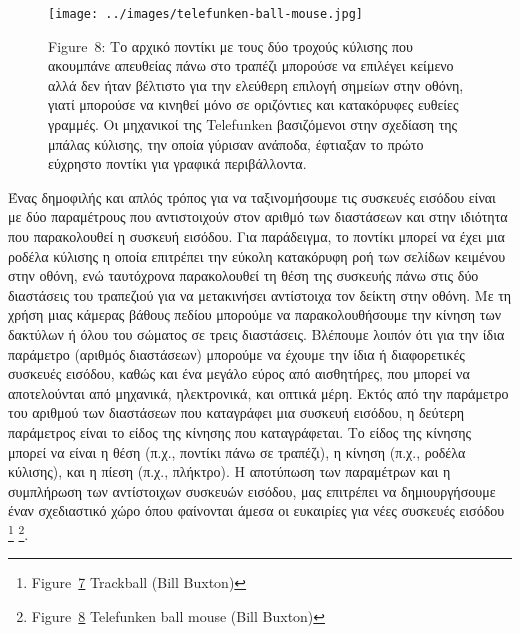 \documentclass[
]{article}
\begin{document}
\leavevmode{}%
\begin{figure}
\hypertarget{fig:telefunken-ball-mouse}{%
\centering
\texttt{[image: ../images/telefunken-ball-mouse.jpg]}
\caption{Figure~8: Το αρχικό ποντίκι με τους δύο τροχούς κύλισης που
ακουμπάνε απευθείας πάνω στο τραπέζι μπορούσε να επιλέγει κείμενο αλλά
δεν ήταν βέλτιστο για την ελεύθερη επιλογή σημείων στην οθόνη, γιατί
μπορούσε να κινηθεί μόνο σε οριζόντιες και κατακόρυφες ευθείες γραμμές.
Οι μηχανικοί της Telefunken βασιζόμενοι στην σχεδίαση της μπάλας
κύλισης, την οποία γύρισαν ανάποδα, έφτιαξαν το πρώτο εύχρηστο ποντίκι
για γραφικά περιβάλλοντα.}\label{fig:telefunken-ball-mouse}
}
\end{figure}

Ένας δημοφιλής και απλός τρόπος για να ταξινομήσουμε τις συσκευές
εισόδου είναι με δύο παραμέτρους που αντιστοιχούν στον αριθμό των
διαστάσεων και στην ιδιότητα που παρακολουθεί η συσκευή εισόδου. Για
παράδειγμα, το ποντίκι μπορεί να έχει μια ροδέλα κύλισης η οποία
επιτρέπει την εύκολη κατακόρυφη ροή των σελίδων κειμένου στην οθόνη, ενώ
ταυτόχρονα παρακολουθεί τη θέση της συσκευής πάνω στις δύο διαστάσεις
του τραπεζιού για να μετακινήσει αντίστοιχα τον δείκτη στην οθόνη. Με τη
χρήση μιας κάμερας βάθους πεδίου μπορούμε να παρακολουθήσουμε την κίνηση
των δακτύλων ή όλου του σώματος σε τρεις διαστάσεις. Βλέπουμε λοιπόν ότι
για την ίδια παράμετρο (αριθμός διαστάσεων) μπορούμε να έχουμε την ίδια
ή διαφορετικές συσκευές εισόδου, καθώς και ένα μεγάλο εύρος από
αισθητήρες, που μπορεί να αποτελούνται από μηχανικά, ηλεκτρονικά, και
οπτικά μέρη. Εκτός από την παράμετρο του αριθμού των διαστάσεων που
καταγράφει μια συσκευή εισόδου, η δεύτερη παράμετρος είναι το είδος της
κίνησης που καταγράφεται. Το είδος της κίνησης μπορεί να είναι η θέση
(π.χ., ποντίκι πάνω σε τραπέζι), η κίνηση (π.χ., ροδέλα κύλισης), και η
πίεση (π.χ., πλήκτρο). Η αποτύπωση των παραμέτρων και η συμπλήρωση των
αντίστοιχων συσκευών εισόδου, μας επιτρέπει να δημιουργήσουμε έναν
σχεδιαστικό χώρο όπου φαίνονται άμεσα οι ευκαιρίες για νέες συσκευές
εισόδου \footnote{Figure~\protect\hyperlink{fig:trackball}{7} Trackball
  (Bill Buxton)} \footnote{Figure~\protect\hyperlink{fig:telefunken-ball-mouse}{8}
  Telefunken ball mouse (Bill Buxton)}.
\end{document}
